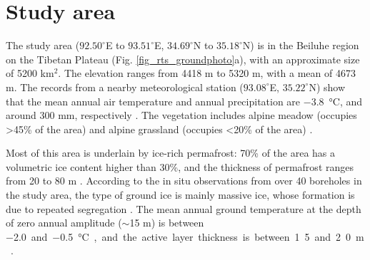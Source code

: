 \documentclass[authoryear,preprint,review,12pt]{elsarticle}
\begin{document}
\section{Study area}
\label{sec_studyarea}
The study area ($92.50^\circ$E to $93.51^\circ$E, $34.69^\circ$N to $35.18^\circ$N) is in the Beiluhe region on the Tibetan Plateau (Fig. \ref{fig_rts_groundphoto}a), with an approximate size of 5200 km$^2$. The elevation ranges from 4418 m to 5320 m, with a mean of 4673 m. The records from a nearby meteorological station ($93.08^\circ$E, $35.22^\circ$N) show that the mean annual air temperature and annual precipitation are \SI{-3.8}{\celsius}, and around 300 mm, respectively \citep{luo_thermokarst_2015}. The vegetation includes alpine meadow (occupies \textgreater 45\% of the area) and alpine grassland (occupies \textless 20\% of the area) \citep{luo_thermokarst_2015}. 

Most of this area is underlain by ice-rich permafrost: 70\% of the area has a volumetric ice content higher than 30\%, 
and the thickness of permafrost ranges from 20 to 80 m \citep{zhou_geocryology_2000, luo_thermokarst_2015}. According to the in situ observations from over 40 boreholes in the study area, the type of ground ice is mainly massive ice, whose formation is due to repeated segregation \citep{guodong1983mechanism}. The mean annual ground temperature at the depth of zero annual amplitude ($\sim$15 m) is between \SI{-2.0} and \SI{-0.5}{\celsius}, and the active layer thickness is between 1.5 and 2.0 m \citep{zhou_geocryology_2000, luo_thermokarst_2015, wu2010changes, wu2015changes}. %
\end{document}
